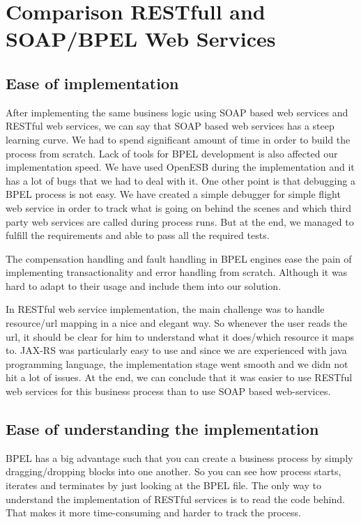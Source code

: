 \section{Comparison RESTfull and SOAP/BPEL Web Services}

\subsection*{Ease of implementation}

After implementing the same business logic using SOAP based web services and RESTful web services, we can say that SOAP based web services has a steep learning curve. We had to spend significant amount of time in order to build the process from scratch. Lack of tools for BPEL development is also affected our implementation speed. We have used OpenESB during the implementation and it has a lot of bugs that we had to deal with it. One other point is that debugging a BPEL process is not easy. We have created a simple debugger for simple flight web service in order to track what is going on behind the scenes and which third party web services are called during process runs. But at the end, we managed to fulfill the requirements and able to pass all the required tests.

The compensation handling and fault handling in BPEL engines ease the pain of implementing transactionality and error handling from scratch. Although it was hard to adapt to their usage and include them into our solution.  

In RESTful web service implementation, the main challenge was to handle resource/url mapping in a nice and elegant way. So whenever the user reads the url, it should be clear for him to understand what it does/which resource it maps to. JAX-RS was particularly easy to use and since we are experienced with java programming language, the implementation stage went smooth and we didn not hit a lot of issues. At the end, we can conclude that it was easier to use RESTful web services for this business process than to use SOAP based web-services. 

\subsection*{Ease of understanding the implementation}

BPEL has a big advantage such that you can create a business process by simply dragging/dropping blocks into one another. So you can see how process starts, iterates and terminates by just looking at the BPEL file. The only way to understand the implementation of RESTful services is to read the code behind. That makes it more time-consuming and harder to track the process. 

